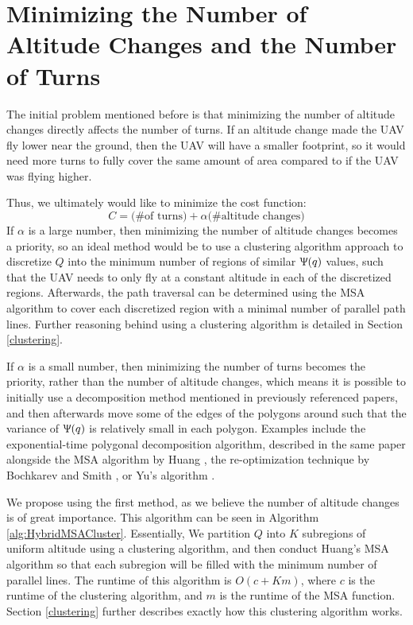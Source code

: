 \documentclass[conference]{IEEEtran}
\theoremstyle{plain}%
\begin{document}
\section{Minimizing the Number of Altitude Changes and the Number of Turns}

The initial problem mentioned before is that minimizing the number of altitude changes directly affects the number of turns. If an altitude change made the UAV fly lower near the ground, then the UAV will have a smaller footprint, so it would need more turns to fully cover the same amount of area compared to if the UAV was flying higher.

Thus, we ultimately would like to minimize the cost function:
\begin{equation}
C = \text{(\# of turns)} + \alpha \text{(\# altitude changes)}
\end{equation}
If $\alpha$ is a large number, then minimizing the number of altitude changes becomes a priority, so an ideal method would be to use a clustering algorithm approach to discretize $Q$ into the minimum number of regions of similar $\Uppsi(q)$ values, such that the UAV needs to only fly at a constant altitude in each of the discretized regions. Afterwards, the path traversal can be determined using the MSA algorithm to cover each discretized region with a minimal number of parallel path lines. Further reasoning behind using a clustering algorithm is detailed in Section \ref{clustering}.

If $\alpha$ is a small number, then minimizing the number of turns becomes the priority, rather than the number of altitude changes, which means it is possible to initially use a decomposition method mentioned in previously referenced papers, and then afterwards move some of the edges of the polygons around such that the variance of $\Uppsi(q)$ is relatively small in each polygon. Examples include the exponential-time polygonal decomposition algorithm, described in the same paper alongside the MSA algorithm by Huang \cite{huang2001optimal}, the re-optimization technique by Bochkarev and Smith \cite{bochkarevminimizing}, or Yu's algorithm \cite{yu2015optimization}.

We propose using the first method, as we believe the number of altitude changes is of great importance. This algorithm can be seen in Algorithm \ref{alg:HybridMSACluster}. Essentially, We partition $Q$ into $K$ subregions of uniform altitude using a clustering algorithm, and then conduct Huang's MSA algorithm \cite{huang2001optimal} so that each subregion will be filled with the minimum number of parallel lines. The runtime of this algorithm is $O(c+Km)$, where $c$ is the runtime of the clustering algorithm, and $m$ is the runtime of the MSA function. Section \ref{clustering} further describes exactly how this clustering algorithm works.
\end{document}
